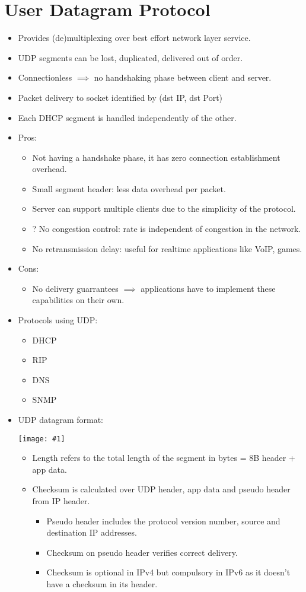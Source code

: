 \documentclass{report}
\makeatletter
\def\maxwidth#1{\ifdim\Gin@nat@width>#1 #1\else\Gin@nat@width\fi}
\newcommand{\mygraphic}[1]{
\begin{center}
    \texttt{[image: \#1]}
\end{center}
}
\makeatother
\begin{document}
\section{User Datagram Protocol}
\label{sec:udp}
\begin{itemize}
\item Provides (de)multiplexing over best effort network layer service.
\item UDP segments can be lost, duplicated, delivered out of order.
\item Connectionless $\implies$ no handshaking phase between client and server.
\item Packet delivery to socket identified by (dst IP, dst Port)
\item Each DHCP segment is handled independently of the other.
\item Pros:
\begin{itemize}
    \item Not having a handshake phase, it has zero connection establishment overhead.
    \item Small segment header: less data overhead per packet.
    \item Server can support multiple clients due to the simplicity of the protocol.
    \item ? No congestion control: rate is independent of congestion in the network.
    \item No retransmission delay: useful for realtime applications like VoIP, games.
\end{itemize}
\item Cons:
\begin{itemize}
    \item No delivery guarrantees $\implies$ applications have to implement these capabilities on their own.
\end{itemize}
\item Protocols using UDP:
\begin{itemize}
    \item DHCP
    \item RIP
    \item DNS
    \item SNMP
\end{itemize}
\item UDP datagram format:
\mygraphic{rsrc/udppacket.png}
\begin{itemize}
\item Length refers to the total length of the segment in bytes = 8B header + app data.
\item Checksum is calculated over UDP header, app data and pseudo header from IP header.
\begin{itemize}
    \item Pseudo header includes the protocol version number, source and destination IP addresses.
    \item Checksum on pseudo header verifies correct delivery.
    \item Checksum is optional in IPv4 but compulsory in IPv6 as it doesn't have a checksum in its header.
\end{itemize}
\end{itemize}
\end{itemize}
\end{document}
